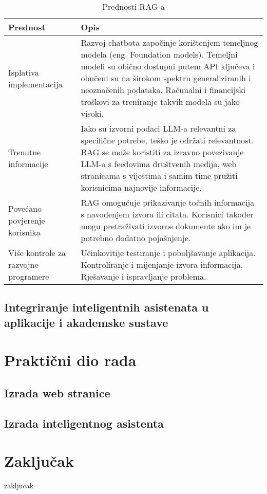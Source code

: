 \documentclass[]{foi}
\begin{document}
\begin{table}[h!]
    \centering
    \caption{Prednosti RAG-a}
    \begin{tabular}{|>{\centering\arraybackslash}m{5cm}|p{10cm}|}
      \hline
      \textbf{Prednost} & \textbf{Opis} \\
      \hline
      Isplativa implementacija & Razvoj chatbota započinje korištenjem temeljnog modela (eng. Foundation models). Temeljni modeli su obično dostupni putem API ključeva i obučeni su na širokom spektru generaliziranih i neoznačenih podataka. Računalni i financijski troškovi za treniranje takvih modela su jako visoki. \\
      \hline
      Trenutne informacije & Iako su izvorni podaci LLM-a relevantni za specifične potrebe, teško je održati relevantnost. RAG se može koristiti za izravno povezivanje LLM-a s feedovima društvenih medija, web stranicama s vijestima i samim time pružiti korisnicima najnovije informacije. \\
      \hline
      Povećano povjerenje korisnika & RAG omogućuje prikazivanje točnih informacija s navođenjem izvora ili citata. Korisnici također mogu pretraživati izvorne dokumente ako im je potrebno dodatno pojašnjenje. \\
      \hline
      Više kontrole za razvojne programere & Učinkovitije testiranje i poboljšavanje aplikacija. Kontroliranje i mijenjanje izvora informacija. Rješavanje i ispravljanje problema. \\
      \hline
    \end{tabular}
\end{table}


\section{Integriranje inteligentnih asistenata u aplikacije i akademske sustave}




\chapter{Praktični dio rada}



\section{Izrada web stranice}

\section{Izrada inteligentnog asistenta}




\chapter{Zaključak}

zakljucak 

\makebackmatter
\end{document}

